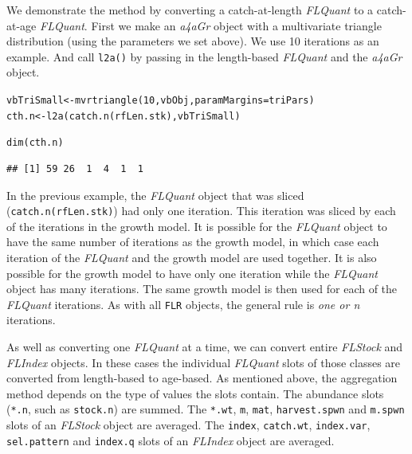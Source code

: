 \documentclass[a4paper,english,10pt]{article}\usepackage[]{graphicx}\usepackage[]{color}
\makeatletter
\newcommand{\hlnum}[1]{\textcolor[rgb]{0.2,0.2,0.2}{#1}}%
\newcommand{\hlstd}[1]{\textcolor[rgb]{0,0,0}{#1}}%
\newcommand{\hlkwb}[1]{\textcolor[rgb]{0.361,0.506,0.596}{#1}}%
\newcommand{\hlkwc}[1]{\textcolor[rgb]{0.361,0.506,0.596}{#1}}%
\newcommand{\hlkwd}[1]{\textcolor[rgb]{0.361,0.506,0.596}{#1}}%
\newenvironment{kframe}{%
 \def\at@end@of@kframe{}%
 \ifinner\ifhmode%
  \def\at@end@of@kframe{\end{minipage}}%
  \begin{minipage}{\columnwidth}%
 \fi\fi%
 \def\FrameCommand##1{\hskip\@totalleftmargin \hskip-\fboxsep
 \colorbox{shadecolor}{##1}\hskip-\fboxsep
     \hskip-\linewidth \hskip-\@totalleftmargin \hskip\columnwidth}%
 \MakeFramed {\advance\hsize-\width
   \@totalleftmargin\z@ \linewidth\hsize
   \@setminipage}}%
 {\par\unskip\endMakeFramed%
 \at@end@of@kframe}
\newenvironment{knitrout}{}{} %
\newcommand{\code}[1]{{\texttt{#1}}}
\newcommand{\pkg}[1]{{\texttt{#1}}}
\newcommand{\class}[1]{{\textit{#1}}}
\makeatother
\begin{document}
We demonstrate the method by converting a catch-at-length \class{FLQuant} to a catch-at-age \class{FLQuant}. First we make an \class{a4aGr} object with a multivariate triangle distribution (using the parameters we set above). We use 10 iterations as an example. And call \code{l2a()} by passing in the length-based \class{FLQuant} and the \class{a4aGr} object.

\begin{knitrout}
\color{fgcolor}\begin{kframe}
\begin{alltt}
\hlstd{vbTriSmall} \hlkwb{<-} \hlkwd{mvrtriangle}\hlstd{(}\hlnum{10}\hlstd{, vbObj,} \hlkwc{paramMargins}\hlstd{=triPars)}
\hlstd{cth.n} \hlkwb{<-} \hlkwd{l2a}\hlstd{(}\hlkwd{catch.n}\hlstd{(rfLen.stk), vbTriSmall)}
\end{alltt}


{\ttfamily\noindent\bfseries\color{errorcolor}{\#\# Error: argument of length 0}}\end{kframe}
\end{knitrout}

\begin{knitrout}
\color{fgcolor}\begin{kframe}
\begin{alltt}
\hlkwd{dim}\hlstd{(cth.n)}
\end{alltt}
\begin{verbatim}
## [1] 59 26  1  4  1  1
\end{verbatim}
\end{kframe}
\end{knitrout}

In the previous example, the \class{FLQuant} object that was sliced (\code{catch.n(rfLen.stk)}) had only one iteration. This iteration was sliced by each of the iterations in the growth model. It is possible for the \class{FLQuant} object to have the same number of iterations as the growth model, in which case each iteration of the \class{FLQuant} and the growth model are used together. It is also possible for the growth model to have only one iteration while the \class{FLQuant} object has many iterations. The same growth model is then used for each of the \class{FLQuant} iterations. As with all \pkg{FLR} objects, the general rule is \emph{one or n} iterations.


As well as converting one \class{FLQuant} at a time, we can convert entire \class{FLStock} and \class{FLIndex} objects. In these cases the individual \class{FLQuant} slots of those classes are converted from length-based to age-based. As mentioned above, the aggregation method depends on the type of values the slots contain. The abundance slots (\code{*.n}, such as \code{stock.n}) are summed. The \code{*.wt}, \code{m}, \code{mat}, \code{harvest.spwn} and \code{m.spwn} slots of an \class{FLStock} object are averaged. The \code{index}, \code{catch.wt}, \code{index.var}, \code{sel.pattern} and \code{index.q} slots of an \class{FLIndex} object are averaged.
\end{document}
